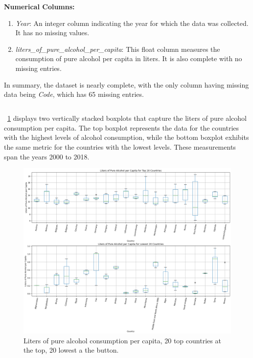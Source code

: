             \textbf{Numerical Columns:}
            \begin{enumerate}
                \item \textit{Year}: An integer column indicating the year for which the data was collected. It has no missing values.
                \item \textit{liters\_of\_pure\_alcohol\_per\_capita}: This float column measures the consumption of pure alcohol per capita in liters. It is also complete with no missing entries.
            \end{enumerate}

            In summary, the dataset is nearly complete, with the only column having missing data being \textit{Code}, which has 65 missing entries.

        \subsection{\duExploreTheData}

            \figurename~\ref{fig:du-alcohol-countries-top-lw-20} displays two vertically stacked boxplots that capture the liters of pure alcohol consumption per capita. The top boxplot represents the data for the countries with the highest levels of alcohol consumption, while the bottom boxplot exhibits the same metric for the countries with the lowest levels. These measurements span the years 2000 to 2018.

            \begin{figure}[H]
                \centering
                \includegraphics[scale=0.4]{images/du_alcohol_li_of_pu_al_pe_ca_cou_t_l_20}
                \caption{Liters of pure alcohol consumption per capita, 20 top countries at the top, 20 lowest a the button.}
                \label{fig:du-alcohol-countries-top-lw-20}
            \end{figure}

